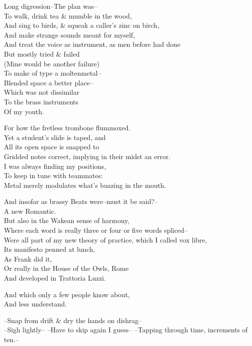 Long digression--The plan was-- \\
To walk, drink tea \& mumble in the wood, \\
And sing to birds, \& squeak a caller's zinc on birch, \\
And make strange sounds meant for myself, \\
And treat the voice as instrument, as men before had done \\
But mostly tried \& failed \\
(Mine would be another failure) \\
To make of type a moltenmetal-- \\
Blended space a better place-- \\
Which was not dissimilar \\
To the brass instruments \\
Of my youth.

For how the fretless trombone flummoxed. \\
Yet a student's slide is taped, and \\
All its open space is snapped to \\
Gridded notes correct, implying in their midst an error. \\
I was always finding my positions, \\
To keep in tune with teammates: \\
Metal merely modulates what's buzzing in the mouth.

And insofar as brassy Beats were--must it be said?-- \\
A new Romantic. \\
But also in the Wakean sense of harmony, \\
Where each word is really three or four or five words spliced-- \\
Were all part of my new theory of practice, which I called vox libre, \\
Its manifesto penned at lunch, \\
As Frank did it, \\
Or really in the House of the Owls, Rome \\
And developed in Trattoria Luzzi.

And which only a few people know about, \\
And less understand.

--Snap from drift \& dry the hands on dishrag-- \\
--Sigh lightly-- 
--Have to skip again I guess--
--Tapping through time, increments of ten.--

